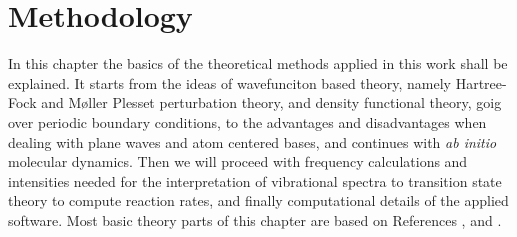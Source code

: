 \documentclass[11pt,DIV=13,BCOR=5mm,a4paper,headinclude]{scrbook}
\begin{document}
\chapter{Methodology}
In this chapter the basics of the theoretical methods applied in this work shall be explained.
It starts from the ideas of wavefunciton based theory, namely Hartree-Fock and M\o{}ller Plesset perturbation theory, and density functional theory, goig over periodic boundary conditions, to the advantages and disadvantages when dealing with plane waves and atom centered bases, and continues with \textit{ab initio} molecular dynamics.
Then we will proceed with frequency calculations and intensities needed for the interpretation of vibrational spectra to transition state theory to compute reaction rates, and finally computational details of the applied software.
Most basic theory parts of this chapter are based on References \cite{jensen}, \cite{Gross03} and \cite{szabo}.
\end{document}
